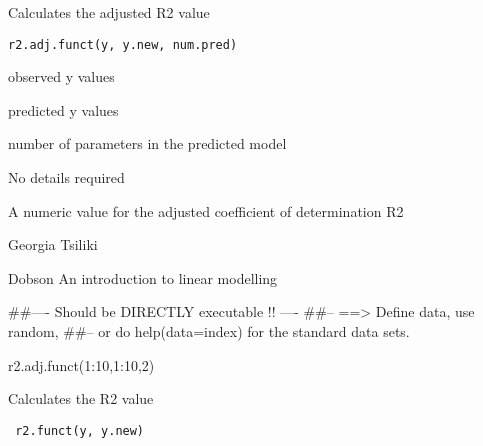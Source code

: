\documentclass[letterpaper]{book}
\begin{document}
%
\begin{Description}\relax
Calculates the adjusted R2 value
\end{Description}
%
\begin{Usage}
\begin{verbatim}
r2.adj.funct(y, y.new, num.pred)
\end{verbatim}
\end{Usage}
%
\begin{Arguments}
\begin{ldescription}
\item[\code{y}]  observed y values 
\item[\code{y.new}]  predicted y values 
\item[\code{num.pred}]  number of parameters in the predicted model
\end{ldescription}
\end{Arguments}
%
\begin{Details}\relax
No details required 
\end{Details}
%
\begin{Value}
 A numeric value for the adjusted coefficient of determination R2 
\end{Value}
%
\begin{Author}\relax
Georgia Tsiliki 
\end{Author}
%
\begin{References}\relax
 Dobson An introduction to linear modelling 
\end{References}
%
\begin{Examples}
\begin{ExampleCode}
##---- Should be DIRECTLY executable !! ----
##-- ==>  Define data, use random,
##--	or do  help(data=index)  for the standard data sets.

r2.adj.funct(1:10,1:10,2)

\end{ExampleCode}
\end{Examples}
%
\begin{Description}\relax
 Calculates the R2 value 
\end{Description}
%
\begin{Usage}
\begin{verbatim}
 r2.funct(y, y.new) 
\end{verbatim}
\end{Usage}
%
\end{document}
